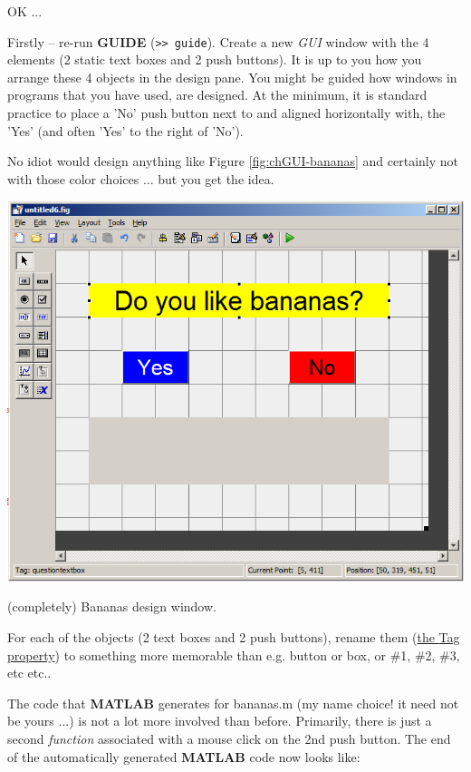 \documentclass{tufte-book} %
\begin{document}
OK ...

Firstly -- re-run \textbf{GUIDE} (\texttt{>> guide}). Create a new \textit{GUI} window with the 4 elements (2 static text boxes and 2 push buttons). It is up to you how you arrange these 4 objects in the design pane. You might be guided how windows in programs that you have used, are designed. At the minimum, it is standard practice to place a 'No' push button next to and aligned horizontally with, the 'Yes' (and often 'Yes' to the right of 'No').

No idiot would design anything like Figure \ref{fig:chGUI-bananas} and certainly not with those color choices ... but you get the idea.

\begin{marginfigure}[0.0in]
\includegraphics[width=\linewidth]{chGUI-bananas.png}
\caption{(completely) Bananas design window.}
\label{fig:chGUI-bananas}
\end{marginfigure}

For each of the objects (2 text boxes and 2 push buttons),  rename them (\uline{the \textsf{Tag} property}) to something more memorable than e.g. button or box, or \#1, \#2, \#3, etc etc..

The code that \textbf{MATLAB} generates for \textsf{bananas.m} (my name choice! it need not be yours ...) is not a lot more involved than before. Primarily, there is just a second \textit{function} associated with a mouse click on the 2nd push button. The end of the automatically generated \textbf{MATLAB} code now looks like:
\end{document}
